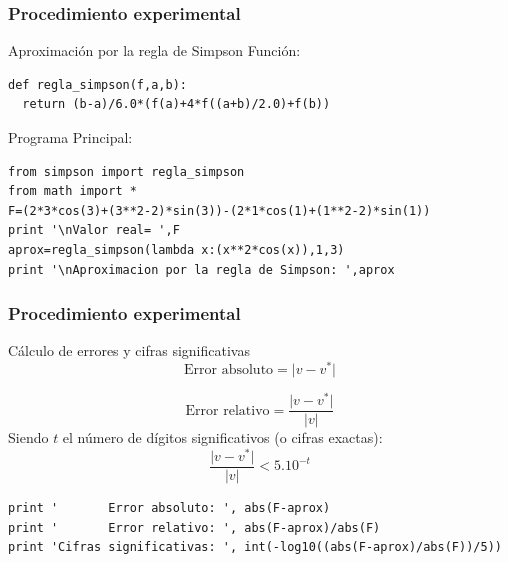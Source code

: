 \documentclass{beamer}
\begin{document}
\begin{frame}[fragile]

  \frametitle{Procedimiento experimental}
  
  \begin{block}{Aproximación por la regla de Simpson}
    Función:
      \begin{center}
        \begin{footnotesize}
          \begin{verbatim}
def regla_simpson(f,a,b):
  return (b-a)/6.0*(f(a)+4*f((a+b)/2.0)+f(b))
          \end{verbatim}
        \end{footnotesize}
      \end{center}
    Programa Principal:
      \begin{center}
        \begin{footnotesize}
          \begin{verbatim}
from simpson import regla_simpson
from math import *
F=(2*3*cos(3)+(3**2-2)*sin(3))-(2*1*cos(1)+(1**2-2)*sin(1))
print '\nValor real= ',F
aprox=regla_simpson(lambda x:(x**2*cos(x)),1,3)
print '\nAproximacion por la regla de Simpson: ',aprox
          \end{verbatim}
        \end{footnotesize}
      \end{center}
  \end{block}
  
\end{frame}
\begin{frame}[fragile]

  \frametitle{Procedimiento experimental}
  
  \begin{block}{Cálculo de errores y cifras significativas}
    \[\text{Error absoluto} = \vert v - v^* \vert\]

    \[\text{Error relativo} = \frac{\vert v - v^* \vert}{\vert v \vert}\]
    Siendo $t$ el número de dígitos significativos (o cifras exactas):
    \[\frac{\vert v - v^* \vert}{\vert v \vert} < 5.10^{-t}\] 
    
    \begin{center}
      \begin{footnotesize}
        \begin{verbatim}
print '       Error absoluto: ', abs(F-aprox)
print '       Error relativo: ', abs(F-aprox)/abs(F)
print 'Cifras significativas: ', int(-log10((abs(F-aprox)/abs(F))/5))
        \end{verbatim}
      \end{footnotesize}
    \end{center}
  \end{block}
  
\end{frame}
\end{document}
